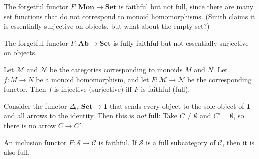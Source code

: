 \documentclass[article, a4paper, 11pt, oneside]{memoir}
\numberwithin{equation}{chapter}
\newcommand{\cat}[1]{\mathcal{#1}}
\newcommand{\ncat}[1]{\mathbf{#1}} %
\newcommand{\catSet}{\ncat{Set}}
\newcommand{\catAb}{\ncat{Ab}}
\newcommand{\catMon}{\ncat{Mon}}
\newcommand{\catC}{\cat{C}}
\newcommand{\catS}{\cat{S}}
\begin{document}
\newcommand{\catM}{\cat{M}}
\newcommand{\catN}{\cat{N}}
\newcommand{\catOne}{\ncat{1}}

\begin{examplebreak}
    \begin{enumexample}
        \item The forgetful functor $F \colon \catMon \to \catSet$ is faithful but not full, since there are many set functions that do not correspond to monoid homomorphisms. (Smith claims it is essentially surjective on objects, but what about the empty set?)

        \item The forgetful functor $F \colon \catAb \to \catSet$ is fully faithful but not essentially surjective on objects.

        \item Let $\catM$ and $\catN$ be the categories corresponding to monoids $M$ and $N$. Let $f \colon M \to N$ be a monoid homomorphism, and let $F \colon \catM \to \catN$ be the corresponding functor. Then $f$ is injective (surjective) iff $F$ is faithful (full).

        \item Consider the  functor $\Delta_0 \colon \catSet \to \catOne$ that sends every object to the sole object of $\catOne$ and all arrows to the identity. Then this is \emph{not} full: Take $C \neq \emptyset$ and $C' = \emptyset$, so there is no arrow $C \to C'$.

        \item An inclusion functor $F \colon \catS \to \catC$ is faithful. If $\catS$ is a full subcategory of $\catC$, then it is also full.
    \end{enumexample}
\end{examplebreak}




\end{document}
